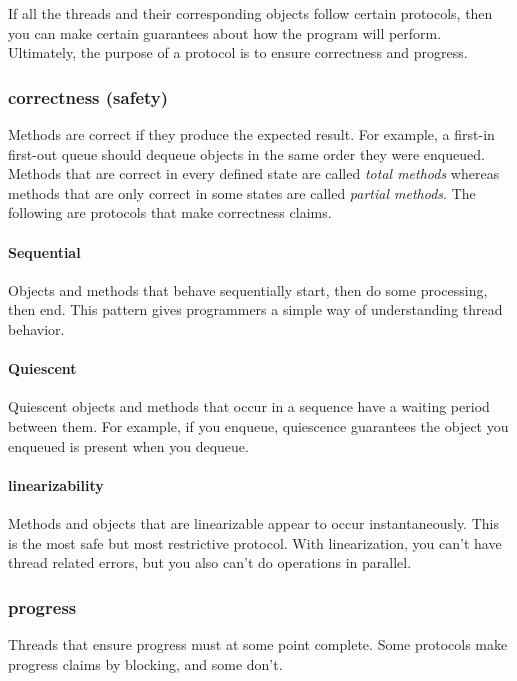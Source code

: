 \documentclass[titlepage]{article}
\begin{document}
If all the threads and their corresponding objects follow certain protocols, then you can make certain guarantees about how the program will perform. Ultimately, the purpose of a protocol is to ensure correctness and progress.

\subsubsection{correctness (safety)}

Methods are correct if they produce the expected result. For example, a first-in first-out queue should dequeue objects in the same order they were enqueued. Methods that are correct in every defined state are called \textit{total methods} whereas methods that are only correct in some states are called \textit{partial methods}. The following are protocols that make correctness claims.

\paragraph*{Sequential}

Objects and methods that behave sequentially start, then do some processing, then end. This pattern gives programmers a simple way of understanding thread behavior.

\paragraph*{Quiescent}

Quiescent objects and methods that occur in a sequence have a waiting period between them. For example, if you enqueue, quiescence guarantees the object you enqueued is present when you dequeue.

\paragraph*{linearizability}

Methods and objects that are linearizable appear to occur instantaneously. This is the most safe but most restrictive protocol. With linearization, you can't have thread related errors, but you also can't do operations in parallel.

\subsubsection{progress}

Threads that ensure progress must at some point complete. Some protocols make progress claims by blocking, and some don't.
\end{document}
